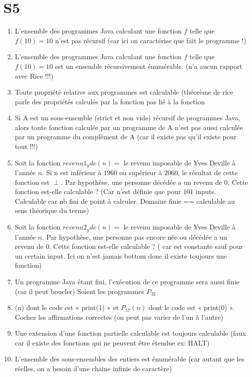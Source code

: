 \documentclass{report}
\begin{document}
\section{S5}
\begin{enumerate}
\item L'ensemble des programmes Java calculant une fonction $f$ telle que $f(10) = 10$ n'est pas récursif (car ici on caractérise que fait le programme !)
\item L’ensemble des programmes Java calculant une fonction $f$ telle que $f(10)=10$ est un ensemble récursivement énumérable. (n'a aucun rapport avec Rice !!!)
\item Toute propriété relative aux programmes est calculable (théorème de rice parle des propriétés calculés par la fonction pas lié à la fonction
\item Si A est un sous-ensemble (strict et non vide)  récursif de programmes Java, alors toute fonction calculée par un programme de A n'est pas aussi calculée par un programme du complément de A (car il existe pas qu'il existe pour tout !!!)
\item Soit la fonction $revenu1_yde(n) =$ le revenu imposable de Yves Deville à l'année $n$.  Si n est inférieur à $1960$ ou supérieur à $2060$, le résultat de cette fonction est $\perp$. Par hypothèse, une personne décédée a un revenu de $0$.  Cette fonction est-elle calculable ? (Car n'est définie que pour $101$ inputs. Calculable car nb fini de point à calculer. Domaine finie == calculable au sens théorique du terme)
\item Soit la fonction $revenu2_yde(n) =$ le revenu imposable de Yves Deville à l'année $n$. Par hypothèse, une personne pas encore née ou décédée a un revenu de $0$. Cette fonction est-elle calculable ? ( car est constante sauf pour un certain input. Ici on n'est jamais bottom donc il existe toujours une fonction)
\item Un programme Java étant fini, l’exécution de ce programme sera aussi finie (car il peut boucler)
	Soient les programmes $P_32$ 
\item (n) dont le code est « print(1) » et $P_57(n)$ dont le code est « print(0) ».  Cochez les affirmations correctes (on peut pas varier de l'un à l'autre)
\item Une extension d’une fonction partielle calculable est toujours calculable (faux car il existe des fonctions qui ne peuvent être étendue ex: HALT)
\item L’ensemble des sous-ensembles des entiers est énumérable (car autant que les réelles, on a besoin d'une chaine infinie de caractère)

\end{enumerate}
\end{document}
